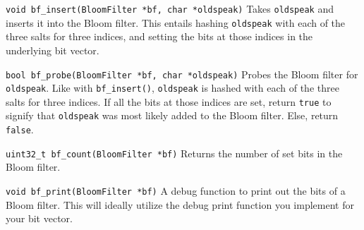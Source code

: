 \begin{funcdoc}{\texttt{void bf\_insert(BloomFilter *bf, char *oldspeak)}}
  Takes \texttt{oldspeak} and inserts it into the Bloom filter. This
  entails hashing \texttt{oldspeak} with each of the three salts for
  three indices, and setting the bits at those indices in the underlying
  bit vector.
\end{funcdoc}

\begin{funcdoc}{\texttt{bool bf\_probe(BloomFilter *bf, char *oldspeak)}}
  Probes the Bloom filter for \texttt{oldspeak}. Like with
  \texttt{bf\_insert()}, \texttt{oldspeak} is hashed with each of the
  three salts for three indices. If all the bits at those indices are
  set, return \texttt{true} to signify that \texttt{oldspeak} was most
  likely added to the Bloom filter. Else, return \texttt{false}.
\end{funcdoc}

\begin{funcdoc}{\texttt{uint32\_t bf\_count(BloomFilter *bf)}}
  Returns the number of set bits in the Bloom filter.
\end{funcdoc}

\begin{funcdoc}{\texttt{void bf\_print(BloomFilter *bf)}}
  A debug function to print out the bits of a Bloom filter. This will
  ideally utilize the debug print function you implement for your bit
  vector.
\end{funcdoc}
